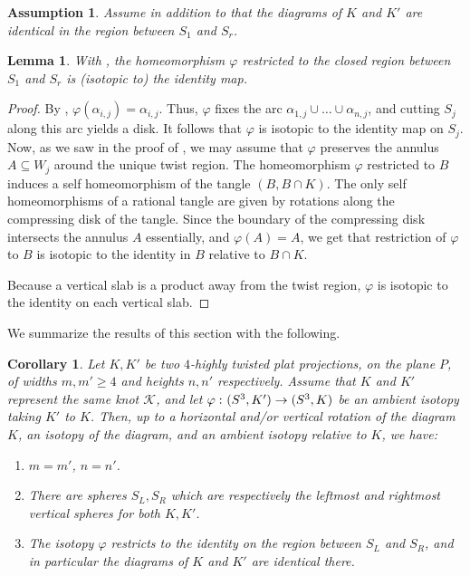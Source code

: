 \documentclass[12pt,reqno]{amsart}
\theoremstyle{plain}
\newtheorem{lemma}[theorem]{Lemma}
\newtheorem{corollary}[theorem]{Corollary}
\newtheorem{assumption}[theorem]{Assumption}
\theoremstyle{definition}
\def\from{\thinspace\colon}
\begin{document}
\begin{assumption}\label{assumption: same middle part}
Assume in addition to  that the diagrams of $K$ and $K'$ 
are identical in the region between  $S_1$ and $S_r$.
\end{assumption}

\begin{lemma}\label{cor: identity in the middle}
With , the homeomorphism $\varphi$ restricted 
to the closed region between $S_1$ and $S_r$ is (isotopic to) the identity map.
\end{lemma}


\begin{proof} 
By , $\varphi(\alpha_{i,j}) = \alpha_{i,j}$.
Thus, $\varphi$ fixes the arc $\alpha_{1,j}\cup \dots \cup \alpha_{n,j}$, 
and cutting $S_j$ along this arc yields a disk. It follows that $\varphi$ 
is isotopic to the identity map on $S_j$. Now, as we saw in the 
proof of , we may assume that $\varphi$ 
preserves the annulus $A\subseteq W_j$ around the unique twist region. 
The homeomorphism $\varphi$ restricted to $B$ induces a self homeomorphism of 
the tangle $(B,B\cap K)$. The only self homeomorphisms of a rational tangle are 
given by rotations along the compressing disk of the tangle. Since the boundary 
of the compressing disk intersects the annulus $A$ essentially, and $\varphi(A) = A$, 
we get that restriction of $\varphi$ to $B$ is isotopic to the identity in $B$ 
relative to $B\cap K$.

Because a vertical slab is a product away from the twist region, $\varphi$ is 
isotopic to the identity on each vertical slab.
\end{proof}

We summarize the results of this section with the following.
\begin{corollary}\label{cor: middle part}
    Let $K,K'$ be two $4$-highly twisted plat projections, 
    on the plane $P$, of widths $m,m'\ge 4$ and heights $n,n'$ respectively. 
    Assume that $K$ and $K'$ represent the same knot $\mathcal{K}$, and 
    let $\varphi\from (S^3,K')\to (S^3,K)$ be an ambient isotopy taking $K'$ to $K$. 
    Then, up to a horizontal and/or vertical rotation of the diagram $K$, an 
    isotopy of the diagram, and an ambient isotopy relative to $K$, we have:
    \begin{enumerate}
        \item $m=m'$, $n=n'$.
        \item There are spheres $S_L,S_R$ which are respectively the leftmost 
        and rightmost vertical spheres for both $K,K'$. 
        \item The isotopy $\varphi$ restricts to the identity on the region 
        between $S_L$ and $S_R$, and in particular the diagrams of $K$ and $K'$ 
        are identical there.
    \end{enumerate}
\end{corollary}
\end{document}
